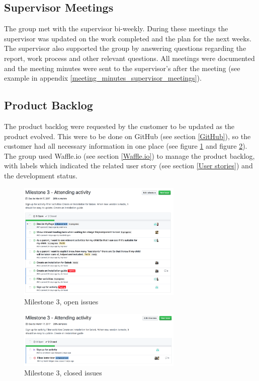 \subsection{Supervisor Meetings}
The group met with the supervisor bi-weekly. During these meetings the supervisor was updated on the work completed and the plan for the next weeks. The supervisor also supported the group by answering questions regarding the report, work process and other relevant questions. All meetings were documented and the meeting minutes were sent to the supervisor's after the meeting (see example in appendix \ref{meeting_minutes_supervisor_meetings}).


\subsection{Product Backlog}
\label{product_backlog}
The product backlog were requested by the customer to be updated as the product evolved. This were to be done on GitHub (see section \ref{GitHub}), so the customer had all necessary information in one place (see figure \ref{Open Issues} and figure \ref{Closed Issues}). The group used Waffle.io (see section \ref{Waffle.io}) to manage the product backlog, with labels which indicated the related user story (see section \ref{User stories}) and the development status.


\begin{figure}[ht]
\centering
    \includegraphics[width=0.7\textwidth]{fig/open_issues}
\caption{Milestone 3, open issues}
\label{Open Issues}
\end{figure}

\begin{figure}[ht]
\centering
    \includegraphics[width=0.7\textwidth]{fig/closed_issues}
\caption{Milestone 3, closed issues}
\label{Closed Issues}
\end{figure}


\cleardoublepage